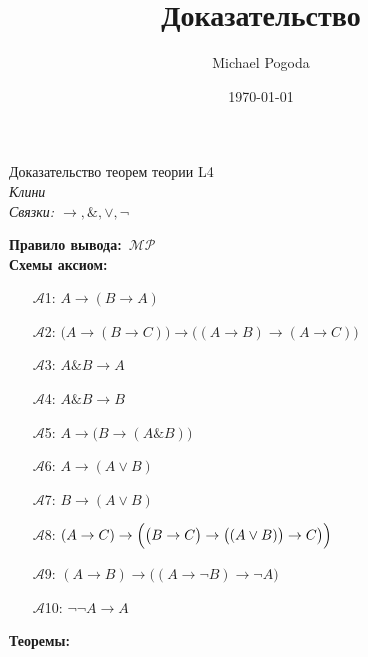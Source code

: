 \documentclass{article}
\title{Доказательство}
\author{Michael Pogoda}
\date{\today}
\begin{document}
\begin{center}
{\Large Доказательство теорем теории L4\\}
\textit{Клини}\\
\textit{Связки: $\rightarrow, \&, \lor, \neg$}\\
\end{center}
\textbf{Правило вывода:}~$\mathcal{MP}$\\
\textbf{Схемы аксиом:}
\begin{enumerate}
\item[$\mathcal{A}$1:] $A\rightarrow\left(B\rightarrow A\right)$
\item[$\mathcal{A}$2:] $\bigl(A\rightarrow\left(B\rightarrow C\right)\bigr)\rightarrow\bigl(\left(A\rightarrow B\right)\rightarrow\left(A\rightarrow C\right)\bigr)$
\item[$\mathcal{A}$3:] $A\&B\rightarrow A$
\item[$\mathcal{A}$4:] $A\&B\rightarrow B$
\item[$\mathcal{A}$5:] $A\rightarrow\bigl(B\rightarrow\left(A\&B\right)\bigr)$
\item[$\mathcal{A}$6:] $A\rightarrow\left(A\lor B\right)$
\item[$\mathcal{A}$7:] $B\rightarrow\left(A\lor B\right)$
\item[$\mathcal{A}$8:] $\left(A\rightarrow C\right)\rightarrow\Bigl(\bigl(B\rightarrow C\bigr)\rightarrow\bigl(\left(A\lor B\right)\bigr)\rightarrow C\bigr)\Bigr)$
\item[$\mathcal{A}$9:] $\left(A\rightarrow B\right)\rightarrow\bigl(\left(A\rightarrow\neg B\right)\rightarrow\neg A\bigr)$
\item[$\mathcal{A}$10:] $\neg\neg A\rightarrow A$
\end{enumerate}
\textbf{Теоремы:}
\end{document}
